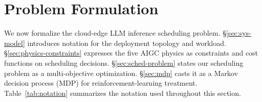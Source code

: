 \section{Problem Formulation}
\label{sec:formulation}

We now formalize the cloud-edge LLM inference scheduling problem.
\S\ref{sec:sys-model} introduces notation for the deployment
topology and workload. \S\ref{sec:physics-constraints} expresses
the five AIGC physics as constraints and cost functions on
scheduling decisions. \S\ref{sec:sched-problem} states our
scheduling problem as a multi-objective optimization.
\S\ref{sec:mdp} casts it as a Markov decision process (MDP) for
reinforcement-learning treatment. Table~\ref{tab:notation}
summarizes the notation used throughout this section.

